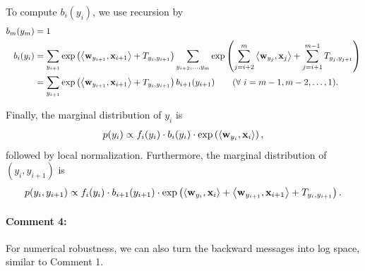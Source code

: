 \documentclass[11pt]{report}
\begin{document}
To compute $b_i(y_i)$, we use recursion by
\begin{align}
	\label{eq:rec_Z_forward_1}
	b_m(y_m) &= 1 \\
	b_i(y_i) &= \sum_{y_{i+1}} \exp \left(\left\langle \mathbf{\boldsymbol{w}}_{y_{i+1}},\mathbf{\boldsymbol{x}}_{i+1} \right\rangle + T_{y_{i}, y_{i+1}}\right)
	\sum_{y_{i+2}, \ldots, y_m} \exp \left(\sum_{j=i+2}^{m} \left\langle \mathbf{\boldsymbol{w}}_{y_j},\mathbf{\boldsymbol{x}}_j \right\rangle + \sum_{j=i+1}^{m-1} T_{y_j, y_{j+1}}\right) \\
	\label{eq:rec_Z_forward_2}
	&= \sum_{y_{i+1}}\exp \left(\left\langle \mathbf{\boldsymbol{w}}_{y_{i+1}},\mathbf{\boldsymbol{x}}_{i+1} \right\rangle + T_{y_{i}, y_{i+1}}\right) b_{i+1}(y_{i+1})  \qquad (\forall\ i = m-1, m-2, \ldots, 1).	 
\end{align}

Finally, the marginal distribution of $y_i$ is
\begin{align}
	p(y_i) \propto f_i(y_i) \cdot b_i(y_i) \cdot \exp \left(\left\langle \mathbf{\boldsymbol{w}}_{y_{i}},\mathbf{\boldsymbol{x}}_{i} \right\rangle\right),
\end{align}
followed by local normalization.
Furthermore, the marginal distribution of $(y_i, y_{i+1})$ is
\begin{align}
	p(y_i, y_{i+1}) \propto f_i(y_i) \cdot b_{i+1}(y_{i+1}) \cdot 
	\exp \left(\left\langle \mathbf{\boldsymbol{w}}_{y_{i}},\mathbf{\boldsymbol{x}}_{i} \right\rangle + \left\langle \mathbf{\boldsymbol{w}}_{y_{i+1}},\mathbf{\boldsymbol{x}}_{i+1} \right\rangle + T_{y_i, y_{i+1}}\right).
\end{align}

\paragraph{Comment 4:}
For numerical robustness,
we can also turn the backward messages into log space, similar to Comment 1.
\end{document}
